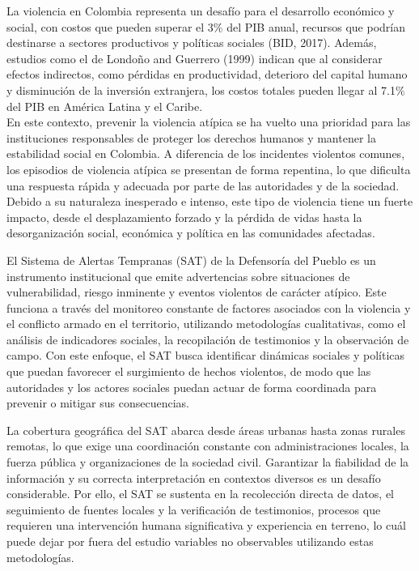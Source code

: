 La violencia en Colombia representa un desafío para el desarrollo económico y social, con costos que pueden superar el 3\% del PIB anual, recursos que podrían destinarse a sectores productivos y políticas sociales (BID, 2017). Además, estudios como el de Londoño and Guerrero (1999) indican que al considerar efectos indirectos, como pérdidas en productividad, deterioro del capital humano y disminución de la inversión extranjera,  los costos totales pueden llegar al 7.1\% del PIB en América Latina y el Caribe.
\\
En este contexto, prevenir la violencia atípica se ha vuelto una prioridad para las instituciones responsables de proteger los derechos humanos y mantener la estabilidad social en Colombia. A diferencia de los incidentes violentos comunes, los episodios de violencia atípica se presentan de forma repentina, lo que dificulta una respuesta rápida y adecuada por parte de las autoridades y de la sociedad. Debido a su naturaleza inesperado e intenso, este tipo de violencia tiene un fuerte impacto, desde el desplazamiento forzado y la pérdida de vidas hasta la desorganización social, económica y política en las comunidades afectadas.

El Sistema de Alertas Tempranas (SAT) de la Defensoría del Pueblo es un instrumento institucional que emite advertencias sobre situaciones de vulnerabilidad, riesgo inminente y eventos violentos de carácter atípico. Este funciona a través del monitoreo constante de factores asociados con la violencia y el conflicto armado en el territorio, utilizando metodologías cualitativas, como el análisis de indicadores sociales, la recopilación de testimonios y la observación de campo. Con este enfoque, el SAT busca identificar dinámicas sociales y políticas que puedan favorecer el surgimiento de hechos violentos, de modo que las autoridades y los actores sociales puedan actuar de forma coordinada para prevenir o mitigar sus consecuencias.

La cobertura geográfica del SAT abarca desde áreas urbanas hasta zonas rurales remotas, lo que exige una coordinación constante con administraciones locales, la fuerza pública y organizaciones de la sociedad civil. Garantizar la fiabilidad de la información y su correcta interpretación en contextos diversos es un desafío considerable. Por ello, el SAT se sustenta en la recolección directa de datos, el seguimiento de fuentes locales y la verificación de testimonios, procesos que requieren una intervención humana significativa y experiencia en terreno, lo cuál puede dejar por fuera del estudio variables no observables utilizando estas metodologías.

